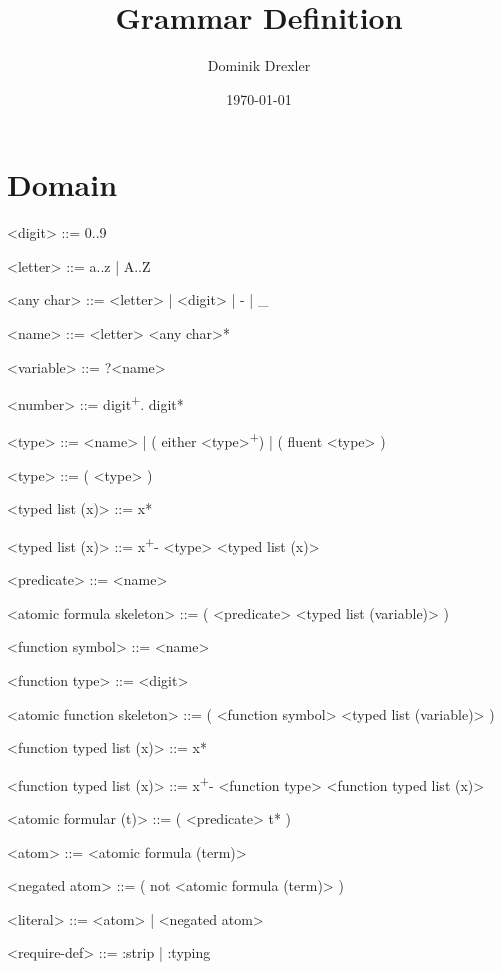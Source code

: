 \documentclass[]{article}
\title{Grammar Definition}
\author{Dominik Drexler}
\date{\today}
\newcommand{\plus}{\textsuperscript{+}}
\begin{document}
\maketitle

\section{Domain}

\begin{grammar}


    <digit> ::= 0..9

    <letter> ::= a..z | A..Z

    <any char> ::= <letter> | <digit> | - | _

    <name> ::= <letter> <any char>*

    <variable> ::= ?<name>

    <number> ::= digit\plus . digit*   %



    <type> ::= <name> | ( either <type>\plus ) | ( fluent <type> )

    <type> ::= ( <type> )

    <typed list (x)> ::= x*

    <typed list (x)> ::= x\plus - <type> <typed list (x)>


    <predicate> ::= <name>

    <atomic formula skeleton> ::= ( <predicate> <typed list (variable)> )



    <function symbol> ::= <name>

    <function type> ::= <digit>

    <atomic function skeleton> ::= ( <function symbol> <typed list (variable)> )

    <function typed list (x)> ::= x*

    <function typed list (x)> ::= x\plus - <function type> <function typed list (x)>


    <atomic formular (t)> ::= ( <predicate> t* )

    <atom> ::= <atomic formula (term)>

    <negated atom> ::= ( not <atomic formula (term)> )

    <literal> ::= <atom> | <negated atom>


    <require-def> ::= :strip | :typing


\end{grammar}
\end{document}
